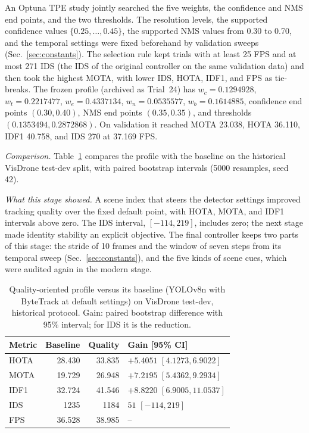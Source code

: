\documentclass[journal]{new-aiaa}
\begin{document}
An Optuna TPE study \cite{akiba2019optuna} jointly searched the five weights,
the confidence and NMS end points, and the two thresholds. The resolution
levels, the supported confidence values $\{0.25,\dots,0.45\}$, the supported
NMS values from 0.30 to 0.70, and the temporal settings were fixed beforehand
by validation sweeps (Sec.~\ref{sec:constants}). The selection rule kept
trials with at least 25 FPS and at most 271 IDS (the IDS of the original
controller on the same validation data) and then took the highest MOTA, with lower IDS, HOTA,
IDF1, and FPS as tie-breaks. The frozen profile (archived as Trial~24) has
$w_c=0.1294928$, $w_t=0.2217477$, $w_e=0.4337134$, $w_n=0.0535577$,
$w_b=0.1614885$, confidence end points $(0.30,0.40)$, NMS end points
$(0.35,0.35)$, and thresholds $(0.1353494, 0.2872868)$. On validation it
reached MOTA 23.038, HOTA 36.110, IDF1 40.758, and IDS 270 at 37.169 FPS.

\emph{Comparison.} Table~\ref{tab:quality} compares the profile with the
baseline on the historical VisDrone test-dev split, with paired bootstrap
intervals (5000 resamples, seed 42).

\emph{What this stage showed.} A scene index that steers the detector settings
improved tracking quality over the fixed default point, with HOTA, MOTA, and
IDF1 intervals above zero. The IDS interval, $[-114, 219]$, includes zero; the
next stage made identity stability an explicit objective. The final
controller keeps two parts of this stage: the stride of 10 frames and the
window of seven steps from its temporal sweep (Sec.~\ref{sec:constants}), and
the five kinds of scene cues, which were audited again in the modern stage.

\begin{table}[htbp]
\caption{Quality-oriented profile versus its baseline (YOLOv8n with ByteTrack
at default settings) on VisDrone test-dev, historical protocol. Gain: paired
bootstrap difference with 95\% interval; for IDS it is the reduction.}
\label{tab:quality}
\centering\footnotesize
\setlength{\tabcolsep}{4pt}
\begin{tabular}{@{}lrrl@{}}
\toprule
Metric & Baseline & Quality & Gain [95\% CI]\\
\midrule
HOTA & 28.430 & 33.835 & $+5.4051$ $[4.1273, 6.9022]$\\
MOTA & 19.729 & 26.948 & $+7.2195$ $[5.4362, 9.2934]$\\
IDF1 & 32.724 & 41.546 & $+8.8220$ $[6.9005, 11.0537]$\\
IDS & 1235 & 1184 & $51$ $[-114, 219]$\\
FPS & 36.528 & 38.985 & --\\
\bottomrule
\end{tabular}
\end{table}
\end{document}
